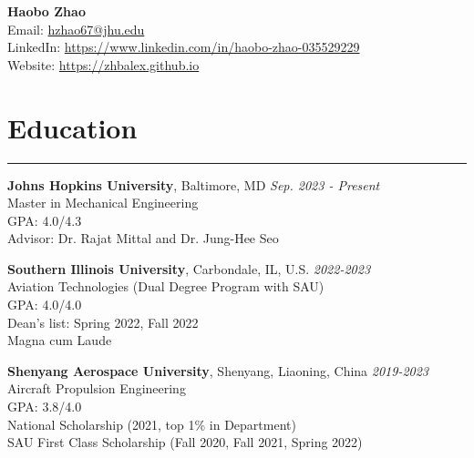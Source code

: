 \documentclass[11pt]{article}
\begin{document}

\begin{center}
    {\LARGE \textbf{Haobo Zhao}} \\
    \vspace{2mm}
    \small
    Email: \href{mailto:hzhao67@jhu.edu}{hzhao67@jhu.edu} \\
    \vspace{1mm}
    LinkedIn: \href{https://www.linkedin.com/in/haobo-zhao-035529229}{https://www.linkedin.com/in/haobo-zhao-035529229} \\
    \vspace{1mm}
    Website: \href{https://zhbalex.github.io}{https://zhbalex.github.io} \\
\end{center}

\vspace{6mm}

\section*{Education}
\hrule

\noindent\textbf{Johns Hopkins University}, Baltimore, MD \hfill \textit{Sep. 2023 - Present} \\
Master in Mechanical Engineering \\
GPA: 4.0/4.3 \\
Advisor: Dr. Rajat Mittal and Dr. Jung-Hee Seo

\vspace{2mm}

\noindent\textbf{Southern Illinois University}, Carbondale, IL, U.S. \hfill \textit{2022-2023} \\
Aviation Technologies (Dual Degree Program with SAU) \\
GPA: 4.0/4.0\\
Dean's list: Spring 2022, Fall 2022\\
Magna cum Laude


\vspace{2mm}

\noindent\textbf{Shenyang Aerospace University}, Shenyang, Liaoning, China \hfill \textit{2019-2023} \\
Aircraft Propulsion Engineering \\
GPA: 3.8/4.0 \\
National Scholarship (2021, top 1\% in Department) \\
SAU First Class Scholarship (Fall 2020, Fall 2021, Spring 2022)
\end{document}
